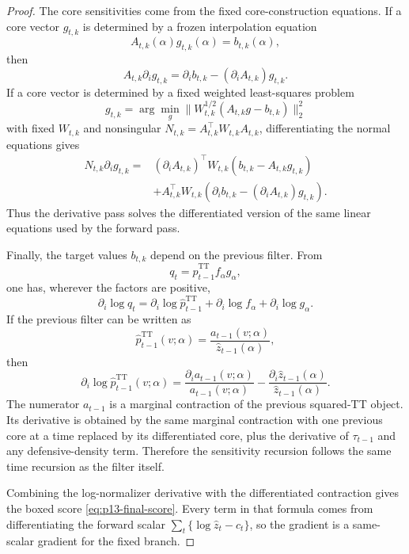 \documentclass[11pt]{article}
\newcommand{\TT}{\mathrm{TT}}
\theoremstyle{definition}
\theoremstyle{remark}
\begin{document}
\begin{proof}
The core sensitivities come from the fixed core-construction equations.  If a
core vector \(g_{t,k}\) is determined by a frozen interpolation equation
\[
  A_{t,k}(\alpha)g_{t,k}(\alpha)=b_{t,k}(\alpha),
\]
then
\[
  A_{t,k}\partial_i g_{t,k}
  =
  \partial_i b_{t,k}
  -
  (\partial_i A_{t,k})g_{t,k}.
  \label{eq:p13-interp-sensitivity}
\]
If a core vector is determined by a fixed weighted least-squares problem
\[
  g_{t,k}
  =
  \arg\min_g
  \|W_{t,k}^{1/2}(A_{t,k}g-b_{t,k})\|_2^2
\]
with fixed \(W_{t,k}\) and nonsingular
\(N_{t,k}=A_{t,k}^\top W_{t,k}A_{t,k}\), differentiating the normal equations
gives
\[
\begin{aligned}
  N_{t,k}\partial_i g_{t,k}
  =
  &(\partial_i A_{t,k})^\top W_{t,k}
    (b_{t,k}-A_{t,k}g_{t,k})\\
  &+
  A_{t,k}^\top W_{t,k}
  (\partial_i b_{t,k}-(\partial_iA_{t,k})g_{t,k}).
  \label{eq:p13-ls-sensitivity}
\end{aligned}
\]
Thus the derivative pass solves the differentiated version of the same
linear equations used by the forward pass.

Finally, the target values \(b_{t,k}\) depend on the previous filter.  From
\[
  q_t
  =
  \widehat p_{t-1}^{\TT}f_\alpha g_\alpha,
\]
one has, wherever the factors are positive,
\[
  \partial_i\log q_t
  =
  \partial_i\log\widehat p_{t-1}^{\TT}
  +
  \partial_i\log f_\alpha
  +
  \partial_i\log g_\alpha.
  \label{eq:p13-logq-sensitivity}
\]
If the previous filter can be written as
\[
  \widehat p_{t-1}^{\TT}(v;\alpha)
  =
  \frac{a_{t-1}(v;\alpha)}{\widehat z_{t-1}(\alpha)},
\]
then
\[
  \partial_i\log\widehat p_{t-1}^{\TT}(v;\alpha)
  =
  \frac{\partial_i a_{t-1}(v;\alpha)}{a_{t-1}(v;\alpha)}
  -
  \frac{\partial_i\widehat z_{t-1}(\alpha)}
       {\widehat z_{t-1}(\alpha)}.
  \label{eq:p13-prev-filter-sensitivity}
\]
The numerator \(a_{t-1}\) is a marginal contraction of the previous
squared-TT object.  Its derivative is obtained by the same marginal
contraction with one previous core at a time replaced by its differentiated
core, plus the derivative of \(\tau_{t-1}\) and any defensive-density term.
Therefore the sensitivity recursion follows the same time recursion as the
filter itself.

Combining the log-normalizer derivative with the differentiated contraction
gives the boxed score \eqref{eq:p13-final-score}.  Every term in that formula
comes from differentiating the forward scalar
\(\sum_t\{\log\widehat z_t-c_t\}\), so the gradient is a same-scalar gradient
for the fixed branch.
\end{proof}
\end{document}
